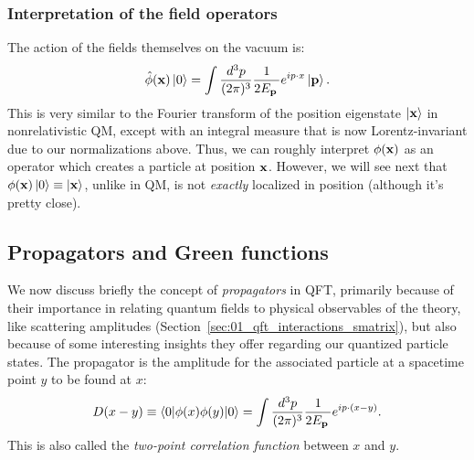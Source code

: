 \subsubsection{Interpretation of the field operators}

The action of the fields themselves on the vacuum is:
\begin{equation}
    \label{eq:01_qft_quantization_field_vacuum}
    \hat \phi(\mathbf{x})\ket{0} = \int \frac{d^3p}{(2\pi)^3} \frac{1}{2E_{\mathbf{p}}\,} e^{ip\cdot x}\ket{\mathbf{p}}.
\end{equation}
This is very similar to the Fourier transform of the position eigenstate $\ket{\mathbf{x}}$ in nonrelativistic QM, except with an integral measure that is now Lorentz-invariant due to our normalizations above.
Thus, we can roughly interpret $\phi(\mathbf{x})$ as an operator which creates a particle at position $\mathbf{x}$.
However, we will see next that $\phi(\mathbf{x})\ket{0} \equiv \ket{\mathbf{x}}$, unlike in QM, is not \textit{exactly} localized in position (although it's pretty close).

\subsection{Propagators and Green functions} 
\label{sec:01_qft_quantization_propagators}

We now discuss briefly the concept of \textit{propagators} in QFT, primarily because of their importance in relating quantum fields to physical observables of the theory, like scattering amplitudes (Section~\ref{sec:01_qft_interactions_smatrix}), but also because of some interesting insights they offer regarding our quantized particle states.
The propagator is the amplitude for the associated particle at a spacetime point $y$ to be found at $x$:
\begin{equation}
    \label{eq:01_qft_quantization_propagator}
    D(x - y) \equiv \braket{0|\phi(x)\phi(y)|0} = \int \frac{d^3p}{(2\pi)^3} \frac{1}{2E_{\mathbf{p}}\,} e^{ip\cdot (x - y)}.
\end{equation}
This is also called the \textit{two-point correlation function} between $x$ and $y$.

